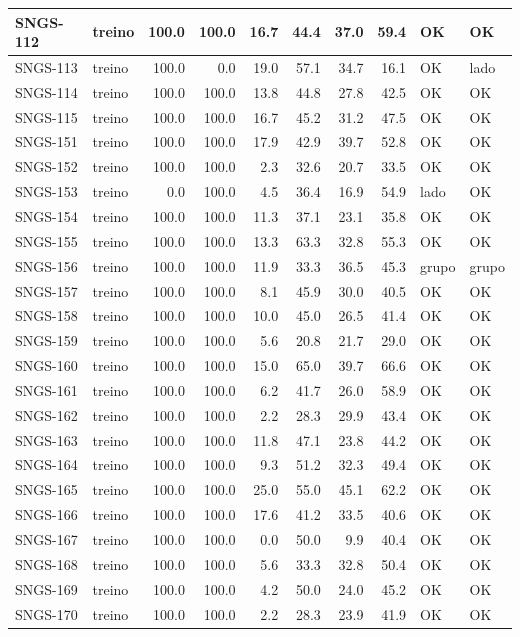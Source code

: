 \begin{small}
\begin{longtable}{|l|l|r|r|r|r|r|r|l|l|}
SNGS-112 & treino & 100.0 & 100.0 & 16.7 & 44.4 & 37.0 & 59.4 & OK & OK \\ \hline
SNGS-113 & treino & 100.0 & 0.0 & 19.0 & 57.1 & 34.7 & 16.1 & OK & lado \\ \hline
SNGS-114 & treino & 100.0 & 100.0 & 13.8 & 44.8 & 27.8 & 42.5 & OK & OK \\ \hline
SNGS-115 & treino & 100.0 & 100.0 & 16.7 & 45.2 & 31.2 & 47.5 & OK & OK \\ \hline
SNGS-151 & treino & 100.0 & 100.0 & 17.9 & 42.9 & 39.7 & 52.8 & OK & OK \\ \hline
SNGS-152 & treino & 100.0 & 100.0 & 2.3 & 32.6 & 20.7 & 33.5 & OK & OK \\ \hline
SNGS-153 & treino & 0.0 & 100.0 & 4.5 & 36.4 & 16.9 & 54.9 & lado & OK \\ \hline
SNGS-154 & treino & 100.0 & 100.0 & 11.3 & 37.1 & 23.1 & 35.8 & OK & OK \\ \hline
SNGS-155 & treino & 100.0 & 100.0 & 13.3 & 63.3 & 32.8 & 55.3 & OK & OK \\ \hline
SNGS-156 & treino & 100.0 & 100.0 & 11.9 & 33.3 & 36.5 & 45.3 & grupo & grupo \\ \hline
SNGS-157 & treino & 100.0 & 100.0 & 8.1 & 45.9 & 30.0 & 40.5 & OK & OK \\ \hline
SNGS-158 & treino & 100.0 & 100.0 & 10.0 & 45.0 & 26.5 & 41.4 & OK & OK \\ \hline
SNGS-159 & treino & 100.0 & 100.0 & 5.6 & 20.8 & 21.7 & 29.0 & OK & OK \\ \hline
SNGS-160 & treino & 100.0 & 100.0 & 15.0 & 65.0 & 39.7 & 66.6 & OK & OK \\ \hline
SNGS-161 & treino & 100.0 & 100.0 & 6.2 & 41.7 & 26.0 & 58.9 & OK & OK \\ \hline
SNGS-162 & treino & 100.0 & 100.0 & 2.2 & 28.3 & 29.9 & 43.4 & OK & OK \\ \hline
SNGS-163 & treino & 100.0 & 100.0 & 11.8 & 47.1 & 23.8 & 44.2 & OK & OK \\ \hline
SNGS-164 & treino & 100.0 & 100.0 & 9.3 & 51.2 & 32.3 & 49.4 & OK & OK \\ \hline
SNGS-165 & treino & 100.0 & 100.0 & 25.0 & 55.0 & 45.1 & 62.2 & OK & OK \\ \hline
SNGS-166 & treino & 100.0 & 100.0 & 17.6 & 41.2 & 33.5 & 40.6 & OK & OK \\ \hline
SNGS-167 & treino & 100.0 & 100.0 & 0.0 & 50.0 & 9.9 & 40.4 & OK & OK \\ \hline
SNGS-168 & treino & 100.0 & 100.0 & 5.6 & 33.3 & 32.8 & 50.4 & OK & OK \\ \hline
SNGS-169 & treino & 100.0 & 100.0 & 4.2 & 50.0 & 24.0 & 45.2 & OK & OK \\ \hline
SNGS-170 & treino & 100.0 & 100.0 & 2.2 & 28.3 & 23.9 & 41.9 & OK & OK \\ \hline
\end{longtable}
\end{small}
